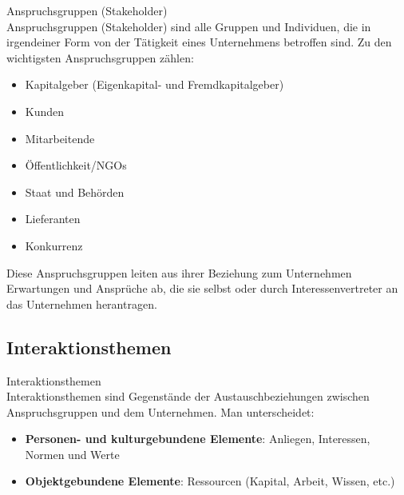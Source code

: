 \begin{definition}{Anspruchsgruppen (Stakeholder)}\\
Anspruchsgruppen (Stakeholder) sind alle Gruppen und Individuen, die in irgendeiner Form von der Tätigkeit eines Unternehmens betroffen sind. Zu den wichtigsten Anspruchsgruppen zählen:
\begin{itemize}
    \item Kapitalgeber (Eigenkapital- und Fremdkapitalgeber)
    \item Kunden
    \item Mitarbeitende
    \item Öffentlichkeit/NGOs
    \item Staat und Behörden
    \item Lieferanten
    \item Konkurrenz
\end{itemize}
Diese Anspruchsgruppen leiten aus ihrer Beziehung zum Unternehmen Erwartungen und Ansprüche ab, die sie selbst oder durch Interessenvertreter an das Unternehmen herantragen.
\end{definition}

\subsection{Interaktionsthemen}

\begin{definition}{Interaktionsthemen}\\
Interaktionsthemen sind Gegenstände der Austauschbeziehungen zwischen Anspruchsgruppen und dem Unternehmen. Man unterscheidet:
\begin{itemize}
    \item \textbf{Personen- und kulturgebundene Elemente}: Anliegen, Interessen, Normen und Werte
    \item \textbf{Objektgebundene Elemente}: Ressourcen (Kapital, Arbeit, Wissen, etc.)
\end{itemize}
\end{definition}

